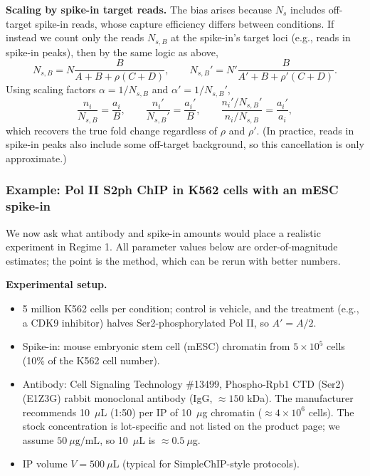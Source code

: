\documentclass[11pt]{article}
\begin{document}
\textbf{Scaling by spike-in target reads.} The bias arises because $N_s$
includes off-target spike-in reads, whose capture efficiency differs
between conditions. If instead we count only the reads $N_{s,B}$ at the
spike-in's target loci (e.g., reads in spike-in peaks), then by the same
logic as above,
$$
N_{s,B}
=N\frac{B}{A+B+\rho(C+D)},
\qquad
N_{s,B}'
=N'\frac{B}{A'+B+\rho'(C+D)}.
$$
Using scaling factors $\alpha=1/N_{s,B}$ and $\alpha'=1/N_{s,B}'$,
$$
\frac{n_i}{N_{s,B}}=\frac{a_i}{B},
\qquad
\frac{n_i'}{N_{s,B}'}=\frac{a_i'}{B},
\qquad
\frac{n_i'/N_{s,B}'}{n_i/N_{s,B}}=\frac{a_i'}{a_i},
$$
which recovers the true fold change regardless of $\rho$ and $\rho'$.
(In practice, reads in spike-in peaks also include some off-target
background, so this cancellation is only approximate.)

\subsubsection{Example: Pol II S2ph ChIP in K562 cells with an mESC spike-in}

We now ask what antibody and spike-in amounts would place a realistic
experiment in Regime 1. All parameter values below are order-of-magnitude
estimates; the point is the method, which can be rerun with better
numbers.

\textbf{Experimental setup.}
\begin{itemize}
    \item 5 million K562 cells per condition; control is vehicle, and the
    treatment (e.g., a CDK9 inhibitor) halves Ser2-phosphorylated Pol II,
    so $A'=A/2$.
    \item Spike-in: mouse embryonic stem cell (mESC) chromatin from
    $5\times10^5$ cells (10\% of the K562 cell number).
    \item Antibody: Cell Signaling Technology \#13499, Phospho-Rpb1 CTD
    (Ser2) (E1Z3G) rabbit monoclonal antibody (IgG, $\approx150$ kDa).
    The manufacturer recommends 10~$\mu$L (1:50) per IP of 10~$\mu$g
    chromatin ($\approx4\times10^6$ cells). The stock concentration is
    lot-specific and not listed on the product page; we assume
    $50~\mu\text{g/mL}$, so 10~$\mu$L is $\approx0.5~\mu$g.
    \item IP volume $V=500~\mu$L (typical for SimpleChIP-style protocols).
\end{itemize}
\end{document}
